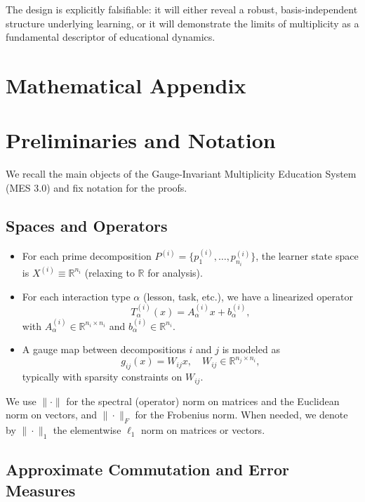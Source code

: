 \documentclass[11pt]{article}
\begin{document}
The design is explicitly falsifiable: it will either reveal a robust, basis-independent structure underlying learning, or it will demonstrate the limits of multiplicity as a fundamental descriptor of educational dynamics.

\appendix
\section*{Mathematical Appendix}

\section{Preliminaries and Notation}

We recall the main objects of the Gauge-Invariant Multiplicity Education System (MES 3.0) and fix notation for the proofs.

\subsection{Spaces and Operators}

\begin{itemize}
  \item For each prime decomposition $P^{(i)} = \{p^{(i)}_1,\dots,p^{(i)}_{n_i}\}$, the learner state space is $X^{(i)} \equiv \mathbb{R}^{n_i}$ (relaxing to $\mathbb{R}$ for analysis).
  \item For each interaction type $\alpha$ (lesson, task, etc.), we have a linearized operator
  \[
    T^{(i)}_\alpha(x) = A^{(i)}_\alpha x + b^{(i)}_\alpha,
  \]
  with $A^{(i)}_\alpha \in \mathbb{R}^{n_i\times n_i}$ and $b^{(i)}_\alpha \in \mathbb{R}^{n_i}$.
  \item A gauge map between decompositions $i$ and $j$ is modeled as
  \[
    g_{ij}(x) = W_{ij} x, \quad W_{ij} \in \mathbb{R}^{n_j \times n_i},
  \]
  typically with sparsity constraints on $W_{ij}$.
\end{itemize}

We use $\|\cdot\|$ for the spectral (operator) norm on matrices and the Euclidean norm on vectors, and $\|\cdot\|_F$ for the Frobenius norm. When needed, we denote by $\|\cdot\|_1$ the elementwise $\ell_1$ norm on matrices or vectors.

\subsection{Approximate Commutation and Error Measures}
\end{document}

